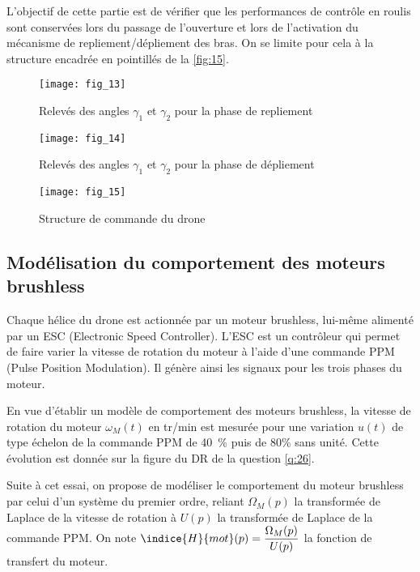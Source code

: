 \begin{obj}
L’objectif de cette partie est de vérifier que les performances de contrôle en roulis sont
conservées lors du passage de l’ouverture et lors de l’activation du mécanisme de repliement/dépliement des bras. On se limite pour cela à la structure encadrée en pointillés de la
\autoref{fig:15}.
\end{obj}

\begin{figure}[H]
\centering
\texttt{[image: fig\_13]}
\caption{\label{fig:13} Relevés des angles $\gamma_1$ et $\gamma_2$ pour la phase de repliement}
\end{figure}

\begin{figure}[H]
\centering
\texttt{[image: fig\_14]}
\caption{\label{fig:14} Relevés des angles $\gamma_1$ et $\gamma_2$ pour la phase de dépliement}
\end{figure}


\begin{figure}[H]
\centering
\texttt{[image: fig\_15]}
\caption{\label{fig:15} Structure de commande du drone}
\end{figure}

\subsection{­Modélisation du comportement des moteurs brushless}

Chaque hélice du drone est actionnée par un moteur brushless, lui-même alimenté par un
ESC (Electronic Speed Controller). L’ESC est un contrôleur qui permet de faire varier la
vitesse de rotation du moteur à l’aide d’une commande PPM (Pulse Position Modulation). Il
génère ainsi les signaux pour les trois phases du moteur.

En vue d’établir un modèle de comportement des moteurs brushless, la vitesse de rotation du
moteur $\omega_M(t)$ en \si{tr/min} est mesurée pour une variation $u(t)$ de type échelon de la commande
PPM de \SI{40}{\%} puis de 80\% sans unité. Cette évolution est donnée sur la figure du DR de la
question \ref{q:26}.

Suite à cet essai, on propose de modéliser le comportement du moteur brushless par celui
d’un système du premier ordre, reliant $\Omega_M(p)$ la transformée de Laplace de la vitesse de rotation à
$U(p)$ la transformée de Laplace de la commande PPM. On note $\indice{H}{mot}(p) = \dfrac{\Omega_M(p)}{
U(p)}$ la fonction de transfert du moteur.

